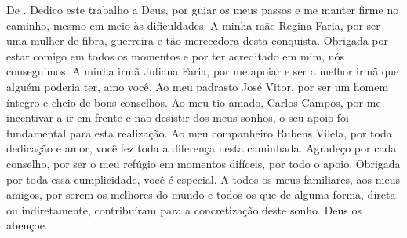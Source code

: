 \begin{dedicatoria}
\vspace*{\fill}
\vspace*{\fill}
\vspace*{\fill}
\vspace*{\fill}
\vspace*{\fill}
\vspace*{\fill}
De \imprimirAutorUm.
\newline
Dedico este trabalho a Deus, por guiar os meus passos e me manter firme no caminho, mesmo em meio às dificuldades. A minha mãe Regina Faria, por ser uma mulher de fibra, guerreira e tão merecedora desta conquista. Obrigada por estar comigo em todos os momentos e por ter acreditado em mim, nós conseguimos. A minha irmã Juliana Faria, por me apoiar e ser a melhor irmã que alguém poderia ter, amo você. Ao meu padrasto José Vitor, por ser um homem íntegro e cheio de bons conselhos. Ao meu tio amado, Carlos Campos, por me incentivar a ir em frente e não desistir dos meus sonhos, o seu apoio foi fundamental para esta realização. Ao meu companheiro Rubens Vilela, por toda dedicação e amor, você fez toda a diferença nesta caminhada. Agradeço por cada conselho, por ser o meu refúgio em momentos difíceis, por todo o apoio. Obrigada por toda essa cumplicidade, você é especial. A todos os meus familiares, aos meus amigos, por serem os melhores do mundo e todos os que de alguma forma, direta ou indiretamente, contribuíram para a concretização deste sonho. Deus os abençoe.


\end{dedicatoria}

